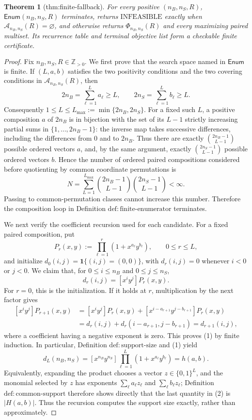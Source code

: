 \documentclass{article}
\newtheorem{theorem}{Theorem}
\begin{document}
\begin{theorem}[thm:finite-fallback]\label{thm:finite-fallback}
For every positive \((n_B,n_S,R)\), \(\mathsf{Enum}(n_B,n_S,R)\) terminates, returns \(\mathrm{INFEASIBLE}\) exactly when \(\mathcal A_{n_B,n_S}(R)=\varnothing\), and otherwise returns \(\Phi_{n_B,n_S}(R)\) and every maximizing paired multiset. Its recurrence table and terminal objective list form a checkable finite certificate.
\end{theorem}
\begin{proof}
Fix \(n_B,n_S,R\in\mathbb Z_{>0}\).  We first prove that the search space named in \(\mathsf{Enum}\) is finite.  If \((L,a,b)\) satisfies the two positivity conditions and the two covering conditions in \(\mathcal A_{n_B,n_S}(R)\), then
\[
  2n_B=\sum_{\ell=1}^{L}a_\ell\ge L,
  \qquad
  2n_S=\sum_{\ell=1}^{L}b_\ell\ge L.
\]
Consequently \(1\le L\le L_{\max}:=\min\{2n_B,2n_S\}\).  For a fixed such \(L\), a positive composition \(a\) of \(2n_B\) is in bijection with the set of its \(L-1\) strictly increasing partial sums in \(\{1,\ldots,2n_B-1\}\): the inverse map takes successive differences, including the differences from \(0\) and to \(2n_B\).  Thus there are exactly \(\binom{2n_B-1}{L-1}\) possible ordered vectors \(a\), and, by the same argument, exactly \(\binom{2n_S-1}{L-1}\) possible ordered vectors \(b\).  Hence the number of ordered paired compositions considered before quotienting by common coordinate permutations is
\[
  N=\sum_{L=1}^{L_{\max}}
       \binom{2n_B-1}{L-1}\binom{2n_S-1}{L-1}<\infty.
\]
Passing to common-permutation classes cannot increase this number.  Therefore the composition loop in Definition \(\mathrm{def{:}finite\text{-}enumerator}\) terminates.

We next verify the coefficient recursion used for each candidate.  For a fixed paired composition, put
\[
  P_r(x,y):=\prod_{\ell=1}^{r}(1+x^{a_\ell}y^{b_\ell}),
  \qquad 0\le r\le L,
\]
and initialize \(d_0(i,j)=\mathbf 1\{(i,j)=(0,0)\}\), with \(d_r(i,j)=0\) whenever \(i<0\) or \(j<0\).  We claim that, for \(0\le i\le n_B\) and \(0\le j\le n_S\),
\[
  d_r(i,j)=[x^iy^j]P_r(x,y).                                      \tag{1}
\]
For \(r=0\), this is the initialization.  If it holds at \(r\), multiplication by the next factor gives
\[
\begin{aligned}
 [x^iy^j]P_{r+1}(x,y)
 &= [x^iy^j]P_r(x,y)
    +[x^{i-a_{r+1}}y^{j-b_{r+1}}]P_r(x,y)\\
 &=d_r(i,j)+d_r(i-a_{r+1},j-b_{r+1})
  =d_{r+1}(i,j),
\end{aligned}
\]
where a coefficient having a negative exponent is zero.  This proves (1) by finite induction.  In particular, Definition \(\mathrm{def{:}support\text{-}size}\) and (1) yield
\[
 d_L(n_B,n_S)
 =[x^{n_B}y^{n_S}]\prod_{\ell=1}^{L}(1+x^{a_\ell}y^{b_\ell})
 =h(a,b).                                                        \tag{2}
\]
Equivalently, expanding the product chooses a vector \(z\in\{0,1\}^L\), and the monomial selected by \(z\) has exponents \(\sum_\ell a_\ell z_\ell\) and \(\sum_\ell b_\ell z_\ell\); Definition \(\mathrm{def{:}common\text{-}support}\) therefore shows directly that the last quantity in (2) is \(|H(a,b)|\).  Thus the recursion computes the support size exactly, rather than approximately.


\end{proof}
\end{document}
